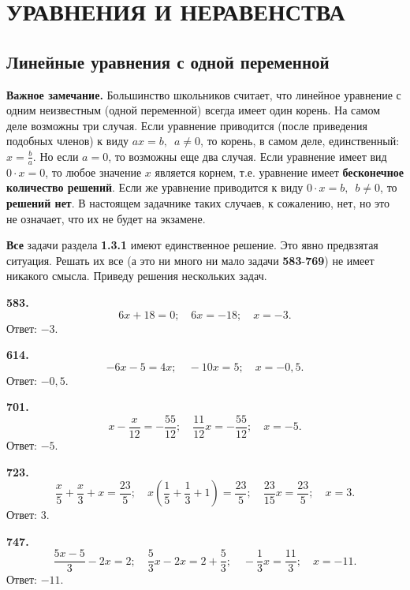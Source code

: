 \section{УРАВНЕНИЯ И НЕРАВЕНСТВА}
\subsection{Линейные уравнения с одной переменной}


\textbf{Важное замечание.} Большинство школьников считает, что линейное уравнение с одним неизвестным (одной переменной) всегда имеет один корень. На самом деле возможны три случая. Если уравнение приводится (после приведения подобных членов) к виду $ax=b,\enspace a\ne0$, то корень, в самом деле, единственный: $x=\frac{b}{a}$. Но если $a=0$, то возможны еще два случая. Если уравнение имеет вид  $0\cdot x=0$, то любое значение $x$ является корнем, т.е. уравнение имеет \textbf{бесконечное количество решений}.  Если же уравнение приводится к виду $0\cdot x=b,\enspace b\ne0$, то \textbf{решений нет}. В настоящем задачнике таких случаев, к сожалению, нет, но это не означает, что их не будет на экзамене. 

\textbf{Все}  задачи раздела  \textbf{1.3.1}  имеют единственное решение. Это явно предвзятая ситуация. Решать их все (а это ни много ни мало задачи  \textbf{583}-\textbf{769}) не имеет никакого смысла. Приведу решения нескольких задач. 

\textbf{583.}  $$6x+18=0;\quad6x=-18;\quad x=-3.$$ \newline \null \hspace*{\fill} Ответ: $-3$.     

\textbf{614.} $$-6x-5=4x;\quad -10x=5;\quad x=-0,5.$$ \newline \null \hspace*{\fill} Ответ: $-0,5$.  

\textbf{701.} $$x-\frac{x}{12}=-\frac{55}{12};\quad \frac{11}{12}x=-\frac{55}{12};\quad x=-5.$$ \newline \null \hspace*{\fill} Ответ: $-5$.   

\newpage \textbf{723.} $$\frac{x}{5}+\frac{x}{3}+x=\frac{23}{5};\quad x\left(\frac{1}{5}+\frac{1}{3}+1\right)=\frac{23}{5};\quad \frac{23}{15}x=\frac{23}{5};\quad x=3.$$ \newline \null \hspace*{\fill} Ответ: $3$.    

\textbf{747.} $$\frac{5x-5}{3}-2x=2;\quad \frac{5}{3}x-2x=2+\frac{5}{3};\quad -\frac{1}{3}x=\frac{11}{3};\quad x=-11.$$ \newline \null \hspace*{\fill} Ответ: $-11$.    

